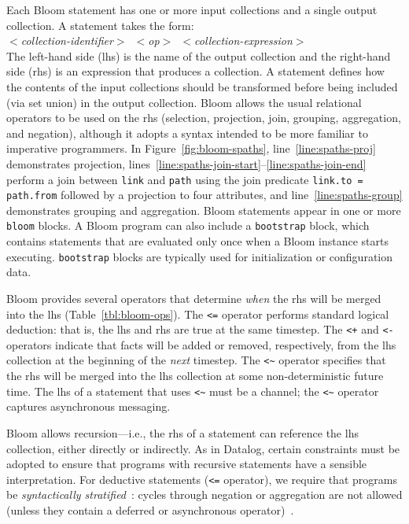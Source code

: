 Each Bloom statement has one or more input collections and a single output
collection.  A statement takes the form: \\ \noindent
\mbox{\hspace{0.25in}\emph{$<$collection-identifier$>$ $<$op$>$
    $<$collection-expression$>$}}\\ \noindent
The left-hand side (lhs) is the name of the output collection and the right-hand
side (rhs) is an expression that produces a collection.  A statement defines how
the contents of the input collections should be transformed before being
included (via set union) in the output collection. Bloom allows the usual
relational operators to be used on the rhs (selection, projection, join,
grouping, aggregation, and negation), although it adopts a syntax intended to be
more familiar to imperative programmers. In Figure~\ref{fig:bloom-spaths},
line~\ref{line:spaths-proj} demonstrates projection,
lines~\ref{line:spaths-join-start}--\ref{line:spaths-join-end} perform a join
between \texttt{link} and \texttt{path} using the join predicate
\verb+link.to = path.from+ followed by a projection to four attributes, and
line~\ref{line:spaths-group} demonstrates grouping and aggregation. Bloom
statements appear in one or more \texttt{bloom} blocks. A Bloom program can also
include a \texttt{bootstrap} block, which contains statements that are evaluated
only once when a Bloom instance starts executing. \texttt{bootstrap} blocks are
typically used for initialization or configuration data.

Bloom provides several operators that determine \emph{when} the rhs will be
merged into the lhs (Table~\ref{tbl:bloom-ops}). The \verb|<=| operator performs
standard logical deduction: that is, the lhs and rhs are true at the same
timestep. The \verb|<+| and \verb|<-| operators indicate that facts will be
added or removed, respectively, from the lhs collection at the beginning of the
{\em next} timestep. The \verb+<~+ operator specifies that the rhs will be merged into
the lhs collection at some non-deterministic future time. The lhs of a statement
that uses \verb+<~+ must be a channel; the \verb+<~+ operator captures
asynchronous messaging.

Bloom allows recursion---i.e., the rhs of a statement can reference the lhs
collection, either directly or indirectly. As in Datalog, certain constraints
must be adopted to ensure that programs with recursive statements have a
sensible interpretation. For deductive statements (\verb+<=+ operator), we
require that programs be \emph{syntactically stratified}~\cite{Apt1988}: cycles
through negation or aggregation are not allowed (unless they contain a deferred
or asynchronous operator)~\cite{dedalus}.

